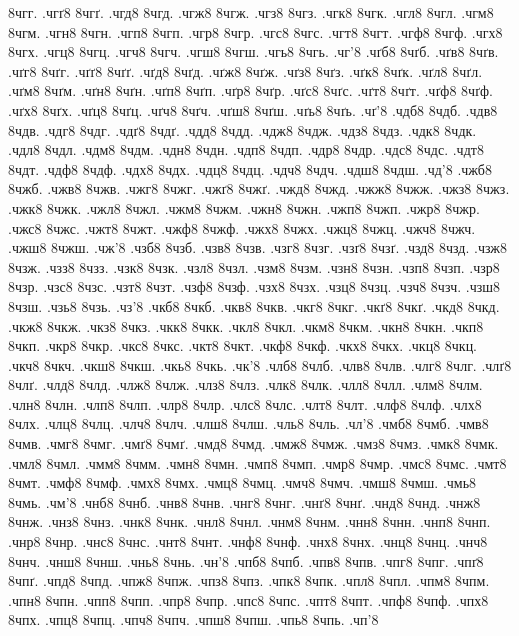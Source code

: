 {8чгг.
.чгґ8
8чгґ.
.чгд8
8чгд.
.чгж8
8чгж.
.чгз8
8чгз.
.чгк8
8чгк.
.чгл8
8чгл.
.чгм8
8чгм.
.чгн8
8чгн.
.чгп8
8чгп.
.чгр8
8чгр.
.чгс8
8чгс.
.чгт8
8чгт.
.чгф8
8чгф.
.чгх8
8чгх.
.чгц8
8чгц.
.чгч8
8чгч.
.чгш8
8чгш.
.чгь8
8чгь.
.чг'8
.чґб8
8чґб.
.чґв8
8чґв.
.чґг8
8чґг.
.чґґ8
8чґґ.
.чґд8
8чґд.
.чґж8
8чґж.
.чґз8
8чґз.
.чґк8
8чґк.
.чґл8
8чґл.
.чґм8
8чґм.
.чґн8
8чґн.
.чґп8
8чґп.
.чґр8
8чґр.
.чґс8
8чґс.
.чґт8
8чґт.
.чґф8
8чґф.
.чґх8
8чґх.
.чґц8
8чґц.
.чґч8
8чґч.
.чґш8
8чґш.
.чґь8
8чґь.
.чґ'8
.чдб8
8чдб.
.чдв8
8чдв.
.чдг8
8чдг.
.чдґ8
8чдґ.
.чдд8
8чдд.
.чдж8
8чдж.
.чдз8
8чдз.
.чдк8
8чдк.
.чдл8
8чдл.
.чдм8
8чдм.
.чдн8
8чдн.
.чдп8
8чдп.
.чдр8
8чдр.
.чдс8
8чдс.
.чдт8
8чдт.
.чдф8
8чдф.
.чдх8
8чдх.
.чдц8
8чдц.
.чдч8
8чдч.
.чдш8
8чдш.
.чд'8
.чжб8
8чжб.
.чжв8
8чжв.
.чжг8
8чжг.
.чжґ8
8чжґ.
.чжд8
8чжд.
.чжж8
8чжж.
.чжз8
8чжз.
.чжк8
8чжк.
.чжл8
8чжл.
.чжм8
8чжм.
.чжн8
8чжн.
.чжп8
8чжп.
.чжр8
8чжр.
.чжс8
8чжс.
.чжт8
8чжт.
.чжф8
8чжф.
.чжх8
8чжх.
.чжц8
8чжц.
.чжч8
8чжч.
.чжш8
8чжш.
.чж'8
.чзб8
8чзб.
.чзв8
8чзв.
.чзг8
8чзг.
.чзґ8
8чзґ.
.чзд8
8чзд.
.чзж8
8чзж.
.чзз8
8чзз.
.чзк8
8чзк.
.чзл8
8чзл.
.чзм8
8чзм.
.чзн8
8чзн.
.чзп8
8чзп.
.чзр8
8чзр.
.чзс8
8чзс.
.чзт8
8чзт.
.чзф8
8чзф.
.чзх8
8чзх.
.чзц8
8чзц.
.чзч8
8чзч.
.чзш8
8чзш.
.чзь8
8чзь.
.чз'8
.чкб8
8чкб.
.чкв8
8чкв.
.чкг8
8чкг.
.чкґ8
8чкґ.
.чкд8
8чкд.
.чкж8
8чкж.
.чкз8
8чкз.
.чкк8
8чкк.
.чкл8
8чкл.
.чкм8
8чкм.
.чкн8
8чкн.
.чкп8
8чкп.
.чкр8
8чкр.
.чкс8
8чкс.
.чкт8
8чкт.
.чкф8
8чкф.
.чкх8
8чкх.
.чкц8
8чкц.
.чкч8
8чкч.
.чкш8
8чкш.
.чкь8
8чкь.
.чк'8
.члб8
8члб.
.члв8
8члв.
.члг8
8члг.
.члґ8
8члґ.
.члд8
8члд.
.члж8
8члж.
.члз8
8члз.
.члк8
8члк.
.члл8
8члл.
.члм8
8члм.
.члн8
8члн.
.члп8
8члп.
.члр8
8члр.
.члс8
8члс.
.члт8
8члт.
.члф8
8члф.
.члх8
8члх.
.члц8
8члц.
.члч8
8члч.
.члш8
8члш.
.чль8
8чль.
.чл'8
.чмб8
8чмб.
.чмв8
8чмв.
.чмг8
8чмг.
.чмґ8
8чмґ.
.чмд8
8чмд.
.чмж8
8чмж.
.чмз8
8чмз.
.чмк8
8чмк.
.чмл8
8чмл.
.чмм8
8чмм.
.чмн8
8чмн.
.чмп8
8чмп.
.чмр8
8чмр.
.чмс8
8чмс.
.чмт8
8чмт.
.чмф8
8чмф.
.чмх8
8чмх.
.чмц8
8чмц.
.чмч8
8чмч.
.чмш8
8чмш.
.чмь8
8чмь.
.чм'8
.чнб8
8чнб.
.чнв8
8чнв.
.чнг8
8чнг.
.чнґ8
8чнґ.
.чнд8
8чнд.
.чнж8
8чнж.
.чнз8
8чнз.
.чнк8
8чнк.
.чнл8
8чнл.
.чнм8
8чнм.
.чнн8
8чнн.
.чнп8
8чнп.
.чнр8
8чнр.
.чнс8
8чнс.
.чнт8
8чнт.
.чнф8
8чнф.
.чнх8
8чнх.
.чнц8
8чнц.
.чнч8
8чнч.
.чнш8
8чнш.
.чнь8
8чнь.
.чн'8
.чпб8
8чпб.
.чпв8
8чпв.
.чпг8
8чпг.
.чпґ8
8чпґ.
.чпд8
8чпд.
.чпж8
8чпж.
.чпз8
8чпз.
.чпк8
8чпк.
.чпл8
8чпл.
.чпм8
8чпм.
.чпн8
8чпн.
.чпп8
8чпп.
.чпр8
8чпр.
.чпс8
8чпс.
.чпт8
8чпт.
.чпф8
8чпф.
.чпх8
8чпх.
.чпц8
8чпц.
.чпч8
8чпч.
.чпш8
8чпш.
.чпь8
8чпь.
.чп'8
}
